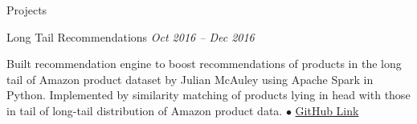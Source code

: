\documentclass{resume} %
\begin{document}
\begin{rSection}{Projects}

\begin{rSubsection}{Long Tail Recommendations} {\emph {Oct 2016 -- Dec 2016}}{}{}
    \item Built recommendation engine to boost recommendations of products in the long tail of Amazon product dataset by Julian McAuley using Apache Spark in Python. Implemented by similarity matching of products lying in head with those in tail of long-tail distribution of Amazon product data.
    {\tiny$\bullet$}
    \href{https://github.com/sudeshnapal12/Long-Tail-Recommendation}{GitHub Link}
\end{rSubsection}

\end{rSection}
\end{document}
